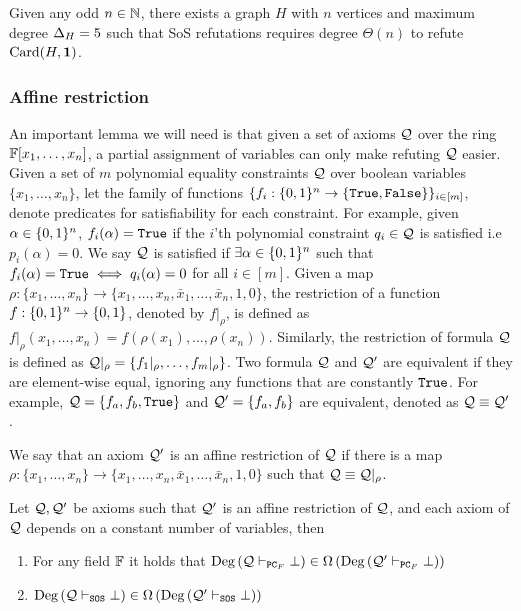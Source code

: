 \documentclass[11pt]{article}
\begin{document}
\begin{lemma}\label{lemma:worst-case-instance-sos}
Given any odd $n \in \mathbb{N}$, there exists a graph $H$ with $n$ vertices and maximum degree $\Delta_{H}= 5$ such that SoS refutations requires degree $\Theta(n)$ to refute $\text{Card}(H, \mathbf{1})$.
\end{lemma}

\subsubsection{Affine restriction} 

An important lemma we will need is that given a set of axioms $\mathcal{Q}$ over the ring $\mathbb{F}[x_1, \dots, x_n]$, a partial assignment of variables can only make refuting $\mathcal{Q}$ easier.
Given a set of $m$ polynomial equality constraints $\mathcal{Q}$ over boolean variables $\{x_1, \dots, x_n\}$, let the family of functions $\{f_i: \{0,1\}^n \rightarrow \{\texttt{True},\texttt{False}\} \}_{i \in [m]}$, denote predicates for satisfiability for each constraint.
For example, given $\alpha \in \{0,1\}^n$, $f_i(\alpha) = \texttt{True}$ if the $i$'th polynomial constraint $q_i \in \mathcal{Q}$ is satisfied i.e $p_i(\alpha) = 0$.
We say $\mathcal{Q}$ is satisfied if $\exists \alpha \in \{0,1\}^n$ such that $f_i(\alpha) = \texttt{True} \iff q_i(\alpha)=0$ for all $i \in [m]$.
Given a map $\rho: \{x_1, \dots, x_n \} \rightarrow \{x_1, \dots, x_n, \bar{x}_1, \dots, \bar{x}_n, 1, 0 \}$, the restriction of a function $f: \{0,1\}^n \rightarrow \{0,1\}$, denoted by $f|_\rho$, is defined as $f|_\rho(x_1, \dots, x_n) = f(\rho(x_1), \dots, \rho(x_n))$.
Similarly, the restriction of formula $\mathcal{Q}$ is defined as $\mathcal{Q}|_\rho = \{f_{1}|_\rho, \dots, f_{m}|_\rho \}$.
Two formula $\mathcal{Q}$ and $\mathcal{Q}'$ are equivalent if they are element-wise equal, ignoring any functions that are constantly $\texttt{True}$.
For example, $\mathcal{Q} = \{f_a, f_b, \texttt{True} \}$ and $\mathcal{Q}' = \{f_a, f_b\}$ are equivalent, denoted as $\mathcal{Q} \equiv \mathcal{Q}'$.


\begin{definition}\label{def:affine-restriction}
We say that an axiom $\mathcal{Q}'$ is an
affine restriction of $\mathcal{Q}$ if there is a map $\rho : \{x_1,\dots,x_n\} \rightarrow \{x_1, \dots, x_n, \bar{x}_1, \dots, \bar{x}_n, 1, 0 \}$ such that $\mathcal{Q} \equiv \mathcal{Q}|_{\rho}$.
\end{definition}


\begin{lemma}\label{lemma:affine_restriction}
Let $\mathcal{Q}, \mathcal{Q}'$ be axioms such that $\mathcal{Q}'$ is an affine restriction of $\mathcal{Q}$, and each axiom
of $\mathcal{Q}$ depends on a constant number of variables, then
\begin{enumerate}
	\item For any field $\mathbb{F}$ it holds that $\text{Deg}\left(\mathcal{Q} \vdash_{\texttt{PC}_F} \bot\right) \in \Omega\left(\text{Deg}\left(\mathcal{Q}' \vdash_{\texttt{PC}_F} \bot\right)\right)$
	\item $\text{Deg}\left(\mathcal{Q} \vdash_{\texttt{SOS}} \bot\right) \in \Omega\left(\text{Deg}\left(\mathcal{Q}' \vdash_{\texttt{SOS}} \bot\right)\right)$
\end{enumerate}
\end{lemma}
\end{document}
